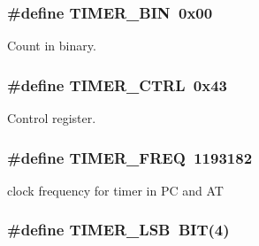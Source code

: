 \subsubsection[{\texorpdfstring{T\+I\+M\+E\+R\+\_\+\+B\+IN}{TIMER_BIN}}]{\setlength{\rightskip}{0pt plus 5cm}\#define T\+I\+M\+E\+R\+\_\+\+B\+IN~0x00}\hypertarget{group__i8254_gad2913dcf2f91453317bd035589ac0a7d}{}\label{group__i8254_gad2913dcf2f91453317bd035589ac0a7d}


Count in binary. 

\subsubsection[{\texorpdfstring{T\+I\+M\+E\+R\+\_\+\+C\+T\+RL}{TIMER_CTRL}}]{\setlength{\rightskip}{0pt plus 5cm}\#define T\+I\+M\+E\+R\+\_\+\+C\+T\+RL~0x43}\hypertarget{group__i8254_ga282832448fb0281ef53d243c1cd48491}{}\label{group__i8254_ga282832448fb0281ef53d243c1cd48491}


Control register. 

\subsubsection[{\texorpdfstring{T\+I\+M\+E\+R\+\_\+\+F\+R\+EQ}{TIMER_FREQ}}]{\setlength{\rightskip}{0pt plus 5cm}\#define T\+I\+M\+E\+R\+\_\+\+F\+R\+EQ~1193182}\hypertarget{group__i8254_gacf926951944b6cf370b7229ebd50dd8b}{}\label{group__i8254_gacf926951944b6cf370b7229ebd50dd8b}


clock frequency for timer in PC and AT 

\subsubsection[{\texorpdfstring{T\+I\+M\+E\+R\+\_\+\+L\+SB}{TIMER_LSB}}]{\setlength{\rightskip}{0pt plus 5cm}\#define T\+I\+M\+E\+R\+\_\+\+L\+SB~{\bf B\+IT}(4)}\hypertarget{group__i8254_gac18cb814ebd0d67235392c330e0e3504}{}\label{group__i8254_gac18cb814ebd0d67235392c330e0e3504}


